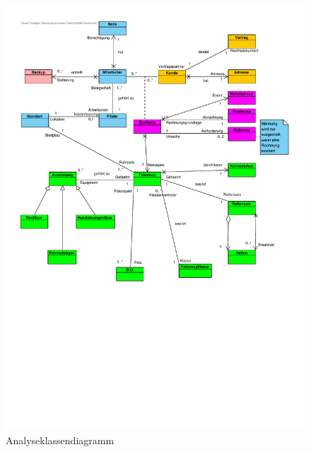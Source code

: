 \begin{figure}[!ht]
    \centering
    \includegraphics[width=\textwidth, trim = 0cm 10cm 0cm 0cm]{Bilder/Diagramme/Analyseklassendiagramm.pdf}
    \caption{Analyseklassendiagramm}
    \label{img:akd}
\end{figure}